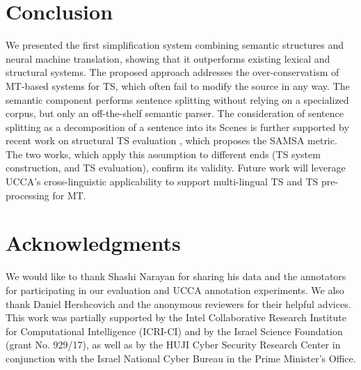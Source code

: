 \documentclass[11pt,a4paper]{article}
\begin{document}
\vspace{-0.2cm}
\section{Conclusion} \label{sec:conclusion}
\vspace{-0.1cm}
We presented the first simplification system combining semantic structures and neural machine translation, showing that it outperforms
existing lexical and structural systems.
The proposed approach addresses the over-conservatism of MT-based systems for TS,
which often fail to modify the source in any way.
The semantic component performs sentence splitting without relying on a specialized corpus, 
but only an off-the-shelf semantic parser. The consideration of sentence splitting as a decomposition of a sentence into its Scenes is further supported by recent work on structural TS evaluation \citep{S18}, which proposes the \textsf{SAMSA} metric. The two works, which apply this assumption to different ends (TS system construction, and TS evaluation), confirm its validity.
Future work will leverage UCCA's cross-linguistic applicability to support multi-lingual TS and TS pre-processing for MT.

\vspace{-0.1cm}
\section*{Acknowledgments}
\vspace{-0.1cm}
We would like to thank Shashi Narayan for sharing his data and the annotators for participating in our evaluation and UCCA annotation experiments.
We also thank Daniel Hershcovich and the anonymous reviewers for their helpful advices. This work was partially supported by the Intel Collaborative Research Institute for Computational Intelligence (ICRI-CI) and by the Israel Science Foundation
(grant No. 929/17), as well as by the HUJI Cyber Security Research
Center in conjunction with the Israel National Cyber
Bureau in the Prime Minister's Office.




\end{document}
